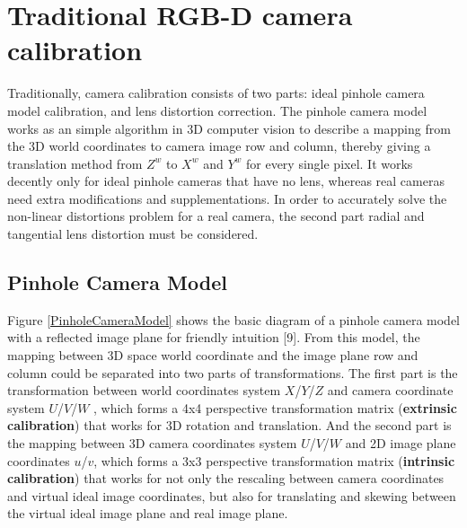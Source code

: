 \section{Traditional RGB-D camera calibration} %
\label{sens_TraditionalCalibration} %
Traditionally, camera calibration consists of two parts: ideal pinhole camera model calibration, and lens distortion correction. The pinhole camera model works as an simple algorithm in 3D computer vision to describe a mapping from the 3D world coordinates to camera image row and column, thereby giving a translation method from \(Z^{w}\) to \(X^{w}\)  and \(Y^{w}\)  for every single pixel. It works decently only for ideal pinhole cameras that have no lens, whereas real cameras need extra modifications and supplementations. In order to accurately solve the non-linear distortions problem for a real camera, the second part radial and tangential lens distortion must be considered.\\\par

\subsection{Pinhole Camera Model}
\label{sectionPinholeCamera}
Figure \ref{PinholeCameraModel} shows the basic diagram of a pinhole camera model with a reflected image plane for friendly intuition
[9].%
From this model, the mapping between 3D space world coordinate and the image plane row and column could be separated into two parts of transformations. The first part is the transformation between world coordinates system \(X\)/\(Y\)/\(Z\) and camera coordinate system \(U\)/\(V\)/\(W\) , which forms a 4x4 perspective transformation matrix (\textbf{extrinsic calibration}) that works for 3D rotation and translation. And the second part is the mapping between 3D camera coordinates system \(U\)/\(V\)/\(W\) and 2D image plane coordinates  \(u\)/\(v\), which forms a 3x3 perspective transformation matrix (\textbf{intrinsic calibration}) that works for not only the rescaling between camera coordinates and virtual ideal image coordinates, but also for translating and skewing between the virtual ideal image plane and real image plane.  \\\\\par

